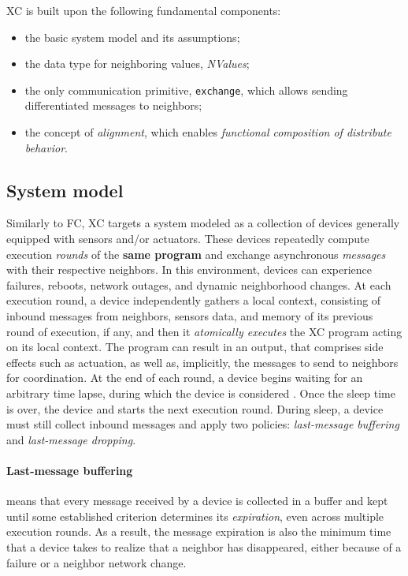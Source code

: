 \ac{XC} is built upon the following fundamental components:
\begin{itemize}
    \item the basic system model and its assumptions;
    \item the data type for neighboring values, \textit{NValues};
    \item the only communication primitive, \texttt{exchange}, which allows sending differentiated messages to neighbors;
    \item the concept of \textit{alignment}, which enables \textit{functional composition of distribute behavior}\cite{xc}.
\end{itemize}


\subsection{System model}

Similarly to \ac{FC}, \ac{XC} targets a system modeled as a collection of devices generally equipped with sensors and/or actuators.
%
These devices repeatedly compute execution \textit{rounds} of the \textbf{same program} and exchange asynchronous \textit{messages} with their respective neighbors\cite{xc}.
%
In this environment, devices can experience failures, reboots, network outages, and dynamic neighborhood changes.
%
At each execution round, a device independently gathers a local context, consisting of inbound messages from neighbors, sensors data, and memory of its previous round of execution, if any, and then it \textit{atomically executes} the \ac{XC} program acting on its local context\cite{xc}.
%
The program can result in an output, that comprises side effects such as actuation, as well as, implicitly, the messages to send to neighbors for coordination\cite{xc}.
%
At the end of each round, a device begins waiting for an arbitrary time lapse, during which the device is considered .
%
Once the sleep time is over, the device  and starts the next execution round\cite{xc}.
%
During sleep, a device must still collect inbound messages and apply two policies: \textit{last-message buffering} and \textit{last-message dropping}.

\paragraph{Last-message buffering} means that every message received by a device is collected in a buffer and kept until some established criterion determines its \textit{expiration}, even across multiple execution rounds\cite{xc}.
%
As a result, the message expiration is also the minimum time that a device takes to realize that a neighbor has disappeared, either because of a failure or a neighbor network change.

